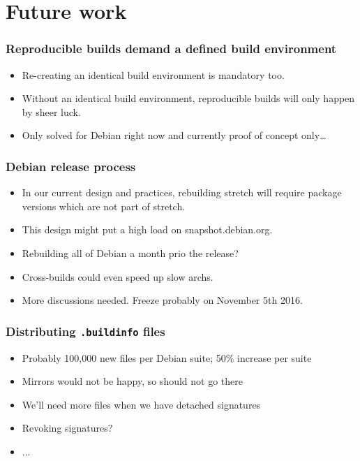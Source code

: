 \documentclass[14pt]{beamer}
\newif\ifplacelogo
\begin{document}
\placelogotrue

\section{Future work}

\begin{frame}
 \frametitle{Reproducible builds demand a defined build environment}
 \begin{itemize}
  \item Re-creating an identical build environment is mandatory too.
  \item Without an identical build environment, reproducible builds will only
  happen by sheer luck.
  \item<2>{Only solved for Debian right now and currently proof of concept only…}
 \end{itemize}
\end{frame}

\begin{frame}
 \frametitle{Debian release process}
 \begin{itemize}
  \item In our current design and practices, rebuilding stretch will require
  package versions which are not part of stretch.
  \item This design might put a high load on snapshot.debian.org.
  \item<2-4>{Rebuilding all of Debian a month prio the release? }
  \item<3-4>{Cross-builds could even speed up slow archs.}
  \item<4>{More discussions needed. Freeze probably on November 5th 2016.}
 \end{itemize}
\end{frame}

\begin{frame}
 \frametitle{Distributing \texttt{.buildinfo} files}
 \begin{itemize}
  \item Probably 100,000 new files per Debian suite; 50\% increase per suite
  \item Mirrors would not be happy, so should not go there
  \item We'll need more files when we have detached signatures
  \item<2>{Revoking signatures?}
  \item<2>{...}
 \end{itemize}
\end{frame}
\end{document}
